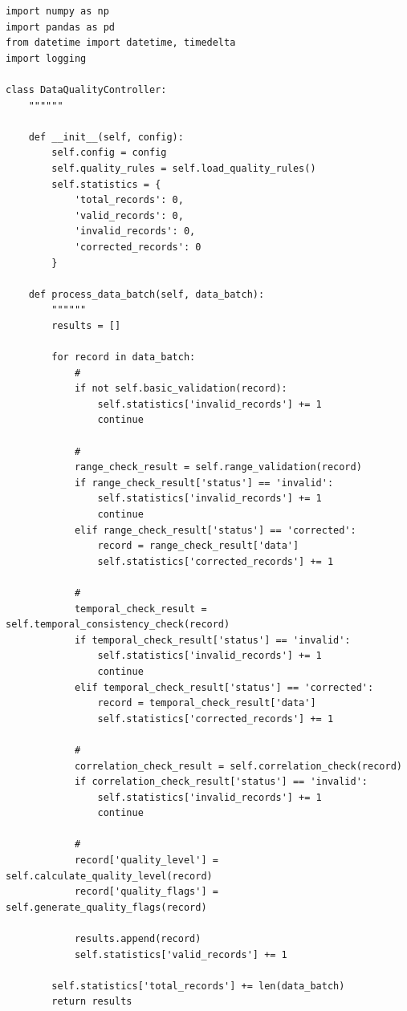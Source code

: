 \begin{lstlisting}[style=python]
import numpy as np
import pandas as pd
from datetime import datetime, timedelta
import logging

class DataQualityController:
    """"""
    
    def __init__(self, config):
        self.config = config
        self.quality_rules = self.load_quality_rules()
        self.statistics = {
            'total_records': 0,
            'valid_records': 0,
            'invalid_records': 0,
            'corrected_records': 0
        }
        
    def process_data_batch(self, data_batch):
        """"""
        results = []
        
        for record in data_batch:
            # 
            if not self.basic_validation(record):
                self.statistics['invalid_records'] += 1
                continue
            
            # 
            range_check_result = self.range_validation(record)
            if range_check_result['status'] == 'invalid':
                self.statistics['invalid_records'] += 1
                continue
            elif range_check_result['status'] == 'corrected':
                record = range_check_result['data']
                self.statistics['corrected_records'] += 1
            
            # 
            temporal_check_result = self.temporal_consistency_check(record)
            if temporal_check_result['status'] == 'invalid':
                self.statistics['invalid_records'] += 1
                continue
            elif temporal_check_result['status'] == 'corrected':
                record = temporal_check_result['data']
                self.statistics['corrected_records'] += 1
            
            # 
            correlation_check_result = self.correlation_check(record)
            if correlation_check_result['status'] == 'invalid':
                self.statistics['invalid_records'] += 1
                continue
            
            # 
            record['quality_level'] = self.calculate_quality_level(record)
            record['quality_flags'] = self.generate_quality_flags(record)
            
            results.append(record)
            self.statistics['valid_records'] += 1
            
        self.statistics['total_records'] += len(data_batch)
        return results
    

\end{lstlisting}
